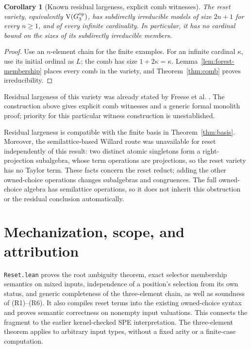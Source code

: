 \documentclass[11pt]{article}
\newtheorem{corollary}[theorem]{Corollary}
\begin{document}
\begin{corollary}[Known residual largeness, explicit comb witnesses]\label{cor:residual}
The reset variety, equivalently $\operatorname{V}(G_3^{\rm op})$, has
subdirectly irreducible models of size $2n+1$ for every $n\geq1$, and
of every infinite cardinality. In particular, it has no cardinal bound
on the sizes of its subdirectly irreducible members.
\end{corollary}
\begin{proof}
Use an $n$-element chain for the finite examples. For an infinite
cardinal $\kappa$, use its initial ordinal as $L$; the comb has size
$1+2\kappa=\kappa$. Lemma~\ref{lem:forest-membership} places every comb
in the variety, and Theorem~\ref{thm:comb} proves irreducibility.
\end{proof}

Residual largeness of this variety was already stated by Freese et al.
\cite[Section~3, before Theorem~3.2]{FreeseEtAl2002}. The construction
above gives explicit comb witnesses and a generic formal monolith proof;
priority for this particular witness construction is unestablished.

Residual largeness is compatible with the finite basis in
Theorem~\ref{thm:basis}. Moreover, the semilattice-based Willard route
was unavailable for reset independently of this result: two distinct
atomic singletons form a right-projection subalgebra, whose term
operations are projections, so the reset variety has no Taylor term.
These facts concern the reset reduct; adding the other owned-choice
operations changes subalgebras and congruences. The full owned-choice
algebra has semilattice operations, so it does not inherit this
obstruction or the residual conclusion automatically.

\section{Mechanization, scope, and attribution}

\texttt{Reset.lean} proves the root ambiguity theorem, exact
selector membership semantics on mixed inputs, independence of a
position's selection from its own status, and generic completeness of
the three-element chain, as well as soundness of (R1)--(R6).
It also compiles reset terms into the existing
owned-choice syntax and proves semantic correctness on nonempty input
valuations. This connects the fragment to the earlier kernel-checked
SPE interpretation. The three-element theorem applies to arbitrary input
types, without a fixed arity or a finite-case computation.
\end{document}
